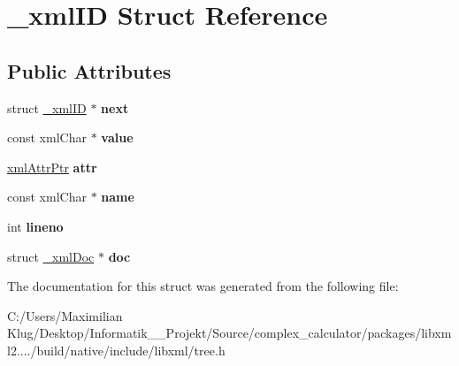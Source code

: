 \hypertarget{struct__xml_i_d}{}\section{\+\_\+xml\+ID Struct Reference}
\label{struct__xml_i_d}
\subsection*{Public Attributes}
\begin{DoxyCompactItemize}
\item 
\mbox{\label{struct__xml_i_d_aecf98546a7f6fa18529f744729c8c5be}} 
struct \mbox{\hyperlink{struct__xml_i_d}{\+\_\+xml\+ID}} $\ast$ {\bfseries next}
\item 
\mbox{\label{struct__xml_i_d_a3adb7dbd11f6592ea3cf01a96d2b62b9}} 
const xml\+Char $\ast$ {\bfseries value}
\item 
\mbox{\label{struct__xml_i_d_a0273ce499877771549f91b374bfb6f95}} 
\mbox{\hyperlink{struct__xml_attr}{xml\+Attr\+Ptr}} {\bfseries attr}
\item 
\mbox{\label{struct__xml_i_d_aad1ef0c2cce7d2e038499f14441493d1}} 
const xml\+Char $\ast$ {\bfseries name}
\item 
\mbox{\label{struct__xml_i_d_a108740dc154fd8bfedb996e6a2de419e}} 
int {\bfseries lineno}
\item 
\mbox{\label{struct__xml_i_d_a166cadc7fb387fbad987b030095f91a4}} 
struct \mbox{\hyperlink{struct__xml_doc}{\+\_\+xml\+Doc}} $\ast$ {\bfseries doc}
\end{DoxyCompactItemize}


The documentation for this struct was generated from the following file\+:\begin{DoxyCompactItemize}
\item 
C\+:/\+Users/\+Maximilian Klug/\+Desktop/\+Informatik\+\_\+\_\+\+Projekt/\+Source/complex\+\_\+calculator/packages/libxml2..../build/native/include/libxml/tree.\+h\end{DoxyCompactItemize}
